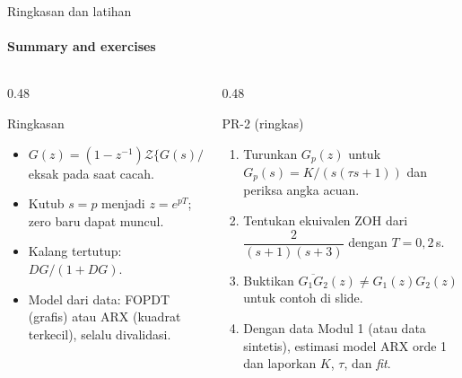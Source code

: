 \documentclass[aspectratio=169,10pt]{beamer}
\begin{document}
\begin{frame}{Ringkasan dan latihan}
	\framesubtitle{Summary and exercises}
	\begin{columns}[T]
		\begin{column}{0.48\textwidth}
			\begin{block}{Ringkasan}
				\small
				\begin{itemize}
					\item $G(z) = (1-z^{-1})\mathcal{Z}\{G(s)/s\}$ eksak pada saat cacah.
					\item Kutub $s=p$ menjadi $z=e^{pT}$; zero baru dapat muncul.
					\item Kalang tertutup: $DG/(1+DG)$.
					\item Model dari data: FOPDT (grafis) atau ARX (kuadrat terkecil), selalu divalidasi.
				\end{itemize}
			\end{block}
		\end{column}
		\begin{column}{0.48\textwidth}
			\begin{exampleblock}{PR-2 (ringkas)}
				\small
				\begin{enumerate}
					\item Turunkan $G_p(z)$ untuk $G_p(s)=K/(s(\tau s+1))$ dan periksa angka acuan.
					\item Tentukan ekuivalen ZOH dari $\dfrac{2}{(s+1)(s+3)}$ dengan $T=0{,}2$\,s.
					\item Buktikan $\overline{G_1G_2}(z) \neq G_1(z)G_2(z)$ untuk contoh di slide.
					\item Dengan data Modul 1 (atau data sintetis), estimasi model ARX orde 1 dan laporkan $K$, $\tau$, dan \textit{fit}.
				\end{enumerate}
			\end{exampleblock}
		\end{column}
	\end{columns}
\end{frame}
\end{document}
